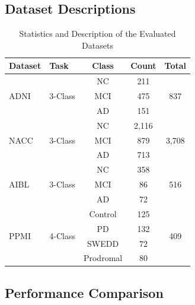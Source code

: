 \documentclass[lettersize,journal]{IEEEtran}
\begin{document}
\subsection{Dataset Descriptions}


\begin{table}[htbp]
    \centering
    \caption{Statistics and Description of the Evaluated Datasets}
    \label{tab:dataset_statistics}
    \begin{tabular}{llccc}
        \toprule
        \textbf{Dataset} & \textbf{Task} & \textbf{Class} & \textbf{Count} & \textbf{Total} \\
        \midrule
        \multirow{3}{*}{ADNI} & \multirow{3}{*}{3-Class} & NC & 211 & \multirow{3}{*}{837} \\
        & & MCI & 475 & \\
        & & AD & 151 & \\
        \midrule
        \multirow{3}{*}{NACC} & \multirow{3}{*}{3-Class} & NC & 2,116 & \multirow{3}{*}{3,708} \\
        & & MCI & 879 & \\
        & & AD & 713 & \\
        \midrule
        \multirow{3}{*}{AIBL} & \multirow{3}{*}{3-Class} & NC & 358 & \multirow{3}{*}{516} \\
        & & MCI & 86 & \\
        & & AD & 72 & \\
        \midrule
        \multirow{4}{*}{PPMI} & \multirow{4}{*}{4-Class} & Control & 125 & \multirow{4}{*}{409} \\
        & & PD & 132 & \\
        & & SWEDD & 72 & \\
        & & Prodromal & 80 & \\
        \bottomrule
    \end{tabular}
\end{table}







\subsection{Performance Comparison}
\end{document}
